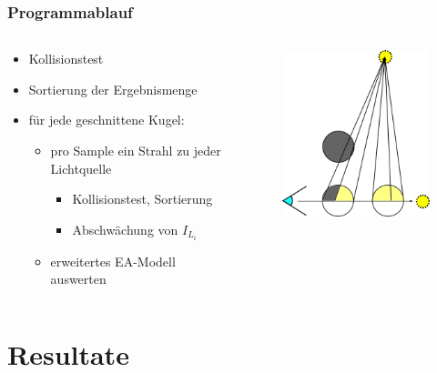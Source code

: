 \documentclass[xcolor=dvipsnames]{beamer}
\begin{document}
\begin{frame}
	\frametitle{Programmablauf}
	\begin{columns}
		\begin{column}{5cm}
			\begin{itemize}
				\item Kollisionstest
				\item Sortierung der Ergebnismenge
				\item für jede geschnittene Kugel:
				\begin{itemize}
					\item pro Sample ein Strahl zu jeder Lichtquelle
					\begin{itemize}
						\item[\textbullet] Kollisionstest, Sortierung
						\item[\textbullet] Abschwächung von $I_{L_i}$
					\end{itemize}
					\item erweitertes EA-Modell auswerten
				\end{itemize}
			\end{itemize}
		\end{column}
		\begin{column}{8cm}
			\begin{figure}
				\includegraphics[width=6cm]{images/ablauf.png}
			\end{figure}
		\end{column}
	\end{columns}
	
\end{frame}

\section{\textbullet \hspace{0.2cm} Resultate}
\end{document}
